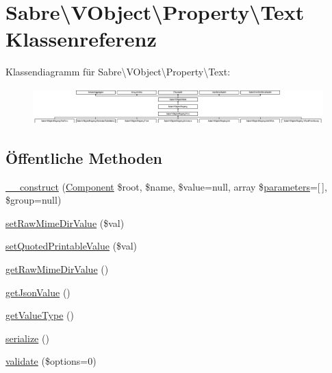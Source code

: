 \hypertarget{class_sabre_1_1_v_object_1_1_property_1_1_text}{}\section{Sabre\textbackslash{}V\+Object\textbackslash{}Property\textbackslash{}Text Klassenreferenz}
\label{class_sabre_1_1_v_object_1_1_property_1_1_text}
Klassendiagramm für Sabre\textbackslash{}V\+Object\textbackslash{}Property\textbackslash{}Text\+:\begin{figure}[H]
\begin{center}
\leavevmode
\includegraphics[height=1.398601cm]{class_sabre_1_1_v_object_1_1_property_1_1_text}
\end{center}
\end{figure}
\subsection*{Öffentliche Methoden}
\begin{DoxyCompactItemize}
\item 
\mbox{\hyperlink{class_sabre_1_1_v_object_1_1_property_1_1_text_a6a278375eff4a0b2e2eb00c4be3002fc}{\+\_\+\+\_\+construct}} (\mbox{\hyperlink{class_sabre_1_1_v_object_1_1_component}{Component}} \$root, \$name, \$value=null, array \$\mbox{\hyperlink{class_sabre_1_1_v_object_1_1_property_a15eeef3d5c2776824cc9b40f1ee18322}{parameters}}=\mbox{[}$\,$\mbox{]}, \$group=null)
\item 
\mbox{\hyperlink{class_sabre_1_1_v_object_1_1_property_1_1_text_acb58aa35dc81be5453f3e56e59215418}{set\+Raw\+Mime\+Dir\+Value}} (\$val)
\item 
\mbox{\hyperlink{class_sabre_1_1_v_object_1_1_property_1_1_text_ac1d4147f1f6192958626484a9e7fd64d}{set\+Quoted\+Printable\+Value}} (\$val)
\item 
\mbox{\hyperlink{class_sabre_1_1_v_object_1_1_property_1_1_text_a6910923b00244a60bc4a57168e23cf98}{get\+Raw\+Mime\+Dir\+Value}} ()
\item 
\mbox{\hyperlink{class_sabre_1_1_v_object_1_1_property_1_1_text_a82f0d49a721cb640b74b82b50c8c531a}{get\+Json\+Value}} ()
\item 
\mbox{\hyperlink{class_sabre_1_1_v_object_1_1_property_1_1_text_a303e8d077a9ed92831150e57570b8144}{get\+Value\+Type}} ()
\item 
\mbox{\hyperlink{class_sabre_1_1_v_object_1_1_property_1_1_text_a8f4d882ad6bbb6658cea980e583050ce}{serialize}} ()
\item 
\mbox{\hyperlink{class_sabre_1_1_v_object_1_1_property_1_1_text_ad0e89eee693a2436d713a74bbe7468b8}{validate}} (\$options=0)
\end{DoxyCompactItemize}
